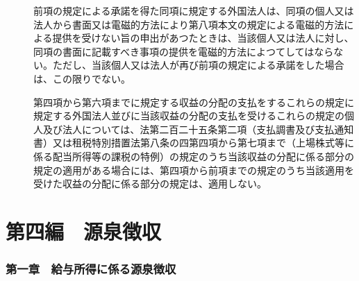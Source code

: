 \documentclass[twocolumn,a4j,10pt]{ltjtarticle}
\begin{document}
\begin{description}
\item[]前項の規定による承諾を得た同項に規定する外国法人は、同項の個人又は法人から書面又は電磁的方法により第八項本文の規定による電磁的方法による提供を受けない旨の申出があつたときは、当該個人又は法人に対し、同項の書面に記載すべき事項の提供を電磁的方法によつてしてはならない。ただし、当該個人又は法人が再び前項の規定による承諾をした場合は、この限りでない。
\item[]第四項から第六項までに規定する収益の分配の支払をするこれらの規定に規定する外国法人並びに当該収益の分配の支払を受けるこれらの規定の個人及び法人については、法第二百二十五条第二項（支払調書及び支払通知書）又は租税特別措置法第八条の四第四項から第七項まで（上場株式等に係る配当所得等の課税の特例）の規定のうち当該収益の分配に係る部分の規定の適用がある場合には、第四項から前項までの規定のうち当該適用を受けた収益の分配に係る部分の規定は、適用しない。
\end{description}
\part*{第四編　源泉徴収}
\section*{第一章　給与所得に係る源泉徴収}
\end{document}
